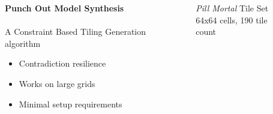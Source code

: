 \documentclass{beamer}
\begin{document}
    \begin{columns}[T,onlytextwidth]
        \hfill \\
        \hfill \\
        \begin{block}{}
          \textbf{Punch Out Model Synthesis} \\
          \hfill \\
          A Constraint Based Tiling Generation algorithm
          \begin{itemize}
            \item Contradiction resilience
            \item Works on large grids
            \item Minimal setup requirements
          \end{itemize}
        \end{block}
        \begin{block}{}
          \begin{figure}
            \textit{Pill Mortal} Tile Set \\
            64x64 cells, 190 tile count
          \end{figure}
        \end{block}
    \end{columns}



\end{document}
